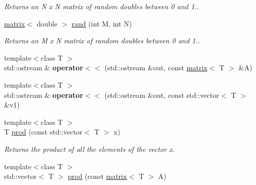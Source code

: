 \begin{DoxyCompactItemize}
\begin{DoxyCompactList}\small\item\em Returns an N x N matrix of random doubles between 0 and 1.. \end{DoxyCompactList}\item 
\hypertarget{namespacekeycpp_adbc446e99edbcde1d69bfe2c74dc3c80}{\hyperlink{classkeycpp_1_1matrix}{matrix}$<$ double $>$ \hyperlink{namespacekeycpp_adbc446e99edbcde1d69bfe2c74dc3c80}{rand} (int M, int N)}\label{namespacekeycpp_adbc446e99edbcde1d69bfe2c74dc3c80}

\begin{DoxyCompactList}\small\item\em Returns an M x N matrix of random doubles between 0 and 1.. \end{DoxyCompactList}\item 
\hypertarget{namespacekeycpp_a55e8bada51586c0561e1b32ca1ab5f2a}{{\footnotesize template$<$class T $>$ }\\std\-::ostream \& {\bfseries operator$<$$<$} (std\-::ostream \&out, const \hyperlink{classkeycpp_1_1matrix}{matrix}$<$ T $>$ \&A)}\label{namespacekeycpp_a55e8bada51586c0561e1b32ca1ab5f2a}

\item 
\hypertarget{namespacekeycpp_a300d8f6e8992c7b33156492d884bd621}{{\footnotesize template$<$class T $>$ }\\std\-::ostream \& {\bfseries operator$<$$<$} (std\-::ostream \&out, const std\-::vector$<$ T $>$ \&v1)}\label{namespacekeycpp_a300d8f6e8992c7b33156492d884bd621}

\item 
\hypertarget{namespacekeycpp_aae8a5ac9572fd012881e19f850b0f47d}{{\footnotesize template$<$class T $>$ }\\T \hyperlink{namespacekeycpp_aae8a5ac9572fd012881e19f850b0f47d}{prod} (const std\-::vector$<$ T $>$ x)}\label{namespacekeycpp_aae8a5ac9572fd012881e19f850b0f47d}

\begin{DoxyCompactList}\small\item\em Returns the product of all the elements of the vector x. \end{DoxyCompactList}\item 
\hypertarget{namespacekeycpp_a0b348cee175715d20a1997b471c47d7a}{{\footnotesize template$<$class T $>$ }\\std\-::vector$<$ T $>$ \hyperlink{namespacekeycpp_a0b348cee175715d20a1997b471c47d7a}{prod} (const \hyperlink{classkeycpp_1_1matrix}{matrix}$<$ T $>$ A)}\label{namespacekeycpp_a0b348cee175715d20a1997b471c47d7a}


\end{DoxyCompactItemize}
